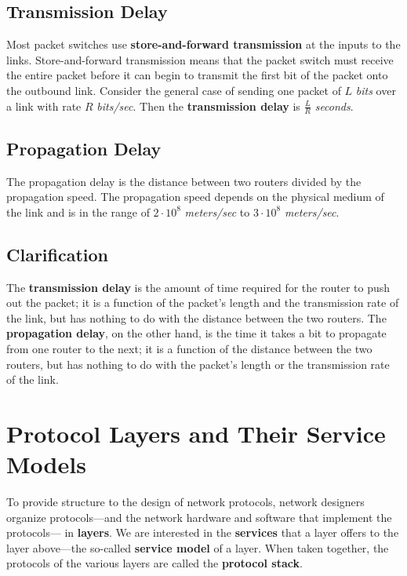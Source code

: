 \documentclass[11pt]{article}
\begin{document}
\subsection{Transmission Delay}

Most packet switches use \textbf{store-and-forward transmission} at the inputs to the links. Store-and-forward transmission means that the packet switch must receive the entire packet before it can begin to transmit the first bit of the packet onto the outbound link. Consider the general case of sending one packet of $L$ \textit{bits} over a link with rate $R$ \textit{bits/sec}. Then the \textbf{transmission delay} is $\frac{L} {R}$ \textit{seconds}.

\subsection{Propagation Delay}

The propagation delay is the distance between two routers divided by the propagation speed. The propagation speed depends on the physical medium of the link and is in the range of $2 \cdot 10^8$ \textit{meters/sec} to $3 \cdot 10^8$ \textit{meters/sec}.

\subsection{Clarification}

The \textbf{transmission delay} is the amount of time required for the router to push out the packet; it is a function of the packet’s length and the transmission rate of the link, but has nothing to do with the distance between the two routers. The \textbf{propagation delay}, on the other hand, is the time it takes a bit to propagate from one router to the next; it is a function of the distance between the two routers, but has nothing to do with the packet’s length or the transmission rate of the link.

\section{Protocol Layers and Their Service Models}

To provide structure to the design of network protocols, network designers organize protocols—and the network hardware and software that implement the protocols— in \textbf{layers}. We are interested in the \textbf{services} that a layer offers to the layer above—the so-called \textbf{service model} of a layer. When taken together, the protocols of the various layers are called the \textbf{protocol stack}.
\end{document}
